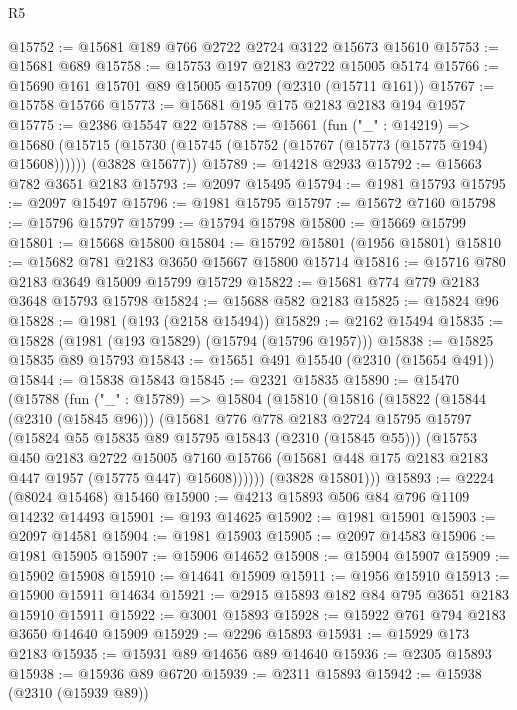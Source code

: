 \begin{lexlean}{R5}
\begin{coremodule}
@15752 := @15681 @189 @766 @2722 @2724 @3122 @15673 @15610
@15753 := @15681 @689
@15758 := @15753 @197 @2183 @2722 @15005 @5174
@15766 := @15690 @161 @15701 @89 @15005 @15709 (@2310 (@15711 @161))
@15767 := @15758 @15766
@15773 := @15681 @195 @175 @2183 @2183 @194 @1957
@15775 := @2386 @15547 @22
@15788 := @15661
    (fun ("_" : @14219) =>
    @15680
      (@15715 (@15730 (@15745 (@15752 (@15767 (@15773 (@15775 @194) @15608))))))
      (@3828 @15677))
@15789 := @14218 @2933
@15792 := @15663 @782 @3651 @2183
@15793 := @2097 @15495
@15794 := @1981 @15793
@15795 := @2097 @15497
@15796 := @1981 @15795
@15797 := @15672 @7160
@15798 := @15796 @15797
@15799 := @15794 @15798
@15800 := @15669 @15799
@15801 := @15668 @15800
@15804 := @15792 @15801 (@1956 @15801)
@15810 := @15682 @781 @2183 @3650 @15667 @15800 @15714
@15816 := @15716 @780 @2183 @3649 @15009 @15799 @15729
@15822 := @15681 @774 @779 @2183 @3648 @15793 @15798
@15824 := @15688 @582 @2183
@15825 := @15824 @96
@15828 := @1981 (@193 (@2158 @15494))
@15829 := @2162 @15494
@15835 := @15828 (@1981 (@193 @15829) (@15794 (@15796 @1957)))
@15838 := @15825 @15835 @89 @15793
@15843 := @15651 @491 @15540 (@2310 (@15654 @491))
@15844 := @15838 @15843
@15845 := @2321 @15835
@15890 := @15470
    (@15788
      (fun ("_" : @15789) =>
      @15804
        (@15810
          (@15816
            (@15822
              (@15844 (@2310 (@15845 @96)))
              (@15681
                @776
                @778
                @2183
                @2724
                @15795
                @15797
                (@15824 @55 @15835 @89 @15795 @15843 (@2310 (@15845 @55)))
                (@15753
                  @450
                  @2183
                  @2722
                  @15005
                  @7160
                  @15766
                  (@15681 @448 @175 @2183 @2183 @447 @1957 (@15775 @447) @15608))))))
        (@3828 @15801)))
@15893 := @2224 (@8024 @15468) @15460
@15900 := @4213 @15893 @506 @84 @796 @1109 @14232 @14493
@15901 := @193 @14625
@15902 := @1981 @15901
@15903 := @2097 @14581
@15904 := @1981 @15903
@15905 := @2097 @14583
@15906 := @1981 @15905
@15907 := @15906 @14652
@15908 := @15904 @15907
@15909 := @15902 @15908
@15910 := @14641 @15909
@15911 := @1956 @15910
@15913 := @15900 @15911 @14634
@15921 := @2915 @15893 @182 @84 @795 @3651 @2183 @15910 @15911
@15922 := @3001 @15893
@15928 := @15922 @761 @794 @2183 @3650 @14640 @15909
@15929 := @2296 @15893
@15931 := @15929 @173 @2183
@15935 := @15931 @89 @14656 @89 @14640
@15936 := @2305 @15893
@15938 := @15936 @89 @6720
@15939 := @2311 @15893
@15942 := @15938 (@2310 (@15939 @89))

\end{coremodule}
\end{lexlean}
